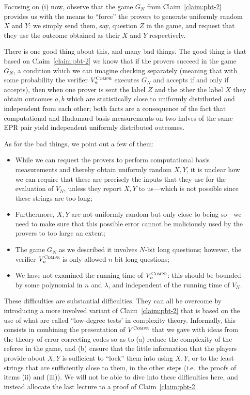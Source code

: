 Focusing on (i) now, observe that the game $G_N$ from Claim~\ref{claim:pbt-2} provides us with the means to ``force'' the provers to generate uniformly random $X$ and $Y$: we simply send them, say, question $Z$ in the game, and request that they use the outcome obtained as their $X$ and $Y$ respectively. 

There is one good thing about this, and many bad things. The good thing is that based on Claim~\ref{claim:pbt-2} we know that if the provers succeed in the game $G_N$, a condition which we can imagine checking separately (meaning that with some probability the verifier $V^{\textsc{Compr}}_n$ executes $G_N$ and accepts if and only if accepts), then when one prover is sent the  label $Z$ and the other the label $X$ they obtain outcomes $a,b$ which are statistically close to uniformly distributed and independent from each other; both facts are a consequence of the fact that computational and Hadamard basis measurements on two halves of the same EPR pair yield independent uniformly distributed outcomes. 

As for the bad things, we point out a few of them:
\begin{itemize}
\item While we can request the provers to perform computational basis measurements and thereby obtain uniformly random $X,Y$, it is unclear how we can require that these are precisely the inputs that they use for the evaluation of $V_N$, unless they report $X,Y$ to us---which is not possible since these strings are too long;
\item Furthermore, $X,Y$ are not uniformly random but only close to being so---we need to make sure that this possible error cannot be maliciously used by the provers to too large an extent;
\item The game $G_N$ as we described it involves $N$-bit long questions; however, the verifier $V^{\textsc{Compr}}_n$ is only allowed $n$-bit long questions;
\item We have not examined the running time of $V^{\textsc{Compr}}_n$: this should be bounded by some polynomial in $n$ and $\lambda$, and independent of the running time of $V_N$. 
\end{itemize}
These difficulties are substantial difficulties. They can all be overcome by introducing a more involved variant of Claim~\ref{claim:pbt-2} that is based on the use of what are called ``low-degree tests' in complexity theory. Informally, this consists in combining the presentation of $V^{\textsc{Compr}}$ that we gave with ideas from the theory of error-correcting codes so as to (a) reduce the complexity of the referee in the game, and (b) ensure that the little information that the players provide about $X,Y$ is sufficient to ``lock'' them into using $X,Y$, or to the least strings that are sufficiently close to them, in the other steps (i.e.\ the proofs of items (ii) and (iii)). We will not be able to dive into these difficulties here, and instead allocate the last lecture to a proof of Claim~\ref{claim:pbt-2}. 

